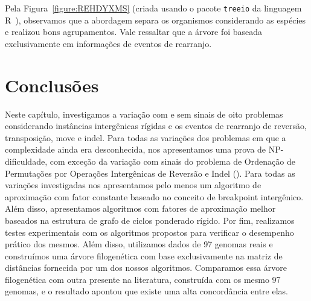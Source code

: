 

Pela Figura~\ref{figure:REHDYXMS} (criada usando o pacote \texttt{treeio} da linguagem R~\cite{wang2020treeio}), observamos que a abordagem separa os organismos considerando as espécies e realizou bons agrupamentos. Vale ressaltar que a árvore foi baseada exclusivamente em informações de eventos de rearranjo.

\section{Conclusões}

Neste capítulo, investigamos a variação com e sem sinais de oito problemas considerando instâncias intergênicas rígidas e os eventos de rearranjo de reversão, transposição, move e indel. 
Para todas as variações dos problemas em que a complexidade ainda era desconhecida, nos apresentamos uma prova de NP-dificuldade, com exceção da variação com sinais do problema de Ordenação de Permutações por Operações Intergênicas de Reversão e Indel (\SbIRI). Para todas as variações investigadas nos apresentamos pelo menos um algoritmo de aproximação com fator constante baseado no conceito de breakpoint intergênico. Além disso, apresentamos algoritmos com fatores de aproximação melhor baseados na estrutura de grafo de ciclos ponderado rígido. Por fim, realizamos testes experimentais com os algoritmos propostos para verificar o desempenho prático dos mesmos. Além disso, utilizamos dados de 97 genomas reais e construímos uma árvore filogenética com base exclusivamente na matriz de distâncias fornecida por um dos nossos algoritmos. Comparamos essa árvore filogenética com outra presente na literatura, construída com os mesmo 97 genomas, e o resultado apontou que existe uma alta concordância entre elas.